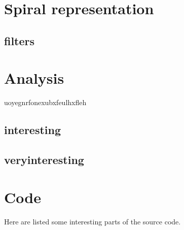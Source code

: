 \documentclass[a4paper,12pt]{article}
\begin{document}
\section{Spiral representation}

\subsection{filters}



\newpage\cleardoublepage{}
\section{Analysis}

uoyegnrfonexubxfeulhxfleh

\subsection{interesting}

\subsection{veryinteresting}


\appendix
\newpage\cleardoublepage{}
\section{Code}

Here are listed some interesting parts of the source code.



\makefig
\makeequ
\makeminted
\makealg
\makeind
\end{document}
